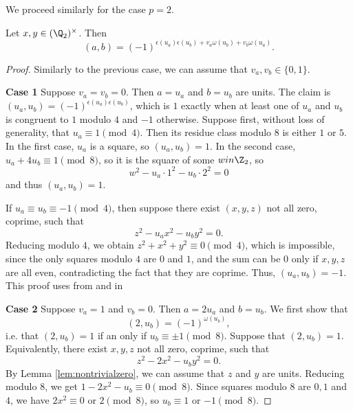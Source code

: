 We proceed similarly for the case $p = 2$.

\begin{theorem}
	\label{thm:padic_2}
	\leanok
Let $x,y \in (\Q_2)^\times$. Then
\[(a,b) = (-1)^{\epsilon(u_a)\epsilon(u_b) + v_a \omega(u_b) + v_b  \omega(u_a)}.\]
\end{theorem}

\begin{proof}
	Similarly to the previous case, we can assume that $v_a, v_b \in \{0, 1\}$.

	\noindent\textbf{Case 1} Suppose $v_a=v_b=0$. Then $a=u_a$ and $b=u_b$ are units. The claim is
		$(u_a,u_b)=(-1)^{\epsilon(u_a)\epsilon(u_b)}$, which is $1$ exactly when at least one of $u_a$
		and $u_b$ is congruent to $1$ modulo $4$ and $-1$ otherwise.
		Suppose first, without loss of generality, that $u_a \equiv 1 \pmod 4$. Then its residue class
		modulo $8$ is either $1$ or $5$. In the first case, $u_a$ is a square, so $(u_a,u_b)=1$. In the
		second case, $u_a+4u_b \equiv 1 \pmod 8$, so it is the square of some $w in \Z_2$, so
		\[
		w^2-u_a\cdot 1^2- u_b\cdot 2^2 = 0
		\]
		and thus $(u_a,u_b)=1$.

		If $u_a \equiv u_b \equiv -1 \pmod 4$, then suppose there exist $(x,y,z)$ not all zero, coprime,
		such that
		\[
		z^2-u_ax^2-u_by^2=0.
		\]
		Reducing modulo $4$, we obtain $z^2+x^2+y^2 \equiv 0 \pmod 4$, which is impossible, since the
		only squares modulo $4$ are $0$ and $1$, and the sum can be $0$ only if $x,y,z$ are all even,
		contradicting the fact that they are coprime. Thus, $(u_a,u_b)=-1$.
		This proof uses  from  and  in 

		\noindent\textbf{Case 2} Suppose $v_a=1$ and $v_b=0$. Then $a=2 u_a$ and $b=u_b$. We first show that
		\[
		(2, u_b) = (-1)^{\omega(u_b)},
		\]
		i.e. that $(2, u_b)=1$ if an only if $u_b \equiv \pm 1 \pmod 8$.
		Suppose that $(2, u_b)=1$. Equivalently, there exist $x,y,z$ not all zero, coprime, such that
		\[
		z^2-2x^2-u_by^2=0.
		\]
		By Lemma \ref{lem:nontrivialzero}, we can assume that $z$ and $y$ are units.
		Reducing modulo $8$, we get $1 - 2x^2 - u_b \equiv 0 \pmod 8$. Since squares modulo $8$ are
		$0, 1$ and $4$, we have $2x^2 \equiv 0$ or $2 \pmod 8$, so $u_b \equiv 1$ or $-1 \pmod 8$.


\end{proof}
